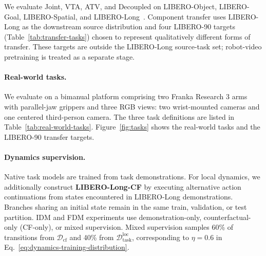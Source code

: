We evaluate Joint, VTA, ATV, and Decoupled on LIBERO-Object, LIBERO-Goal,
LIBERO-Spatial, and LIBERO-Long~\cite{liu2023libero}.
Component transfer uses LIBERO-Long as the downstream source
distribution and four LIBERO-90 targets (Table~\ref{tab:transfer-tasks}) chosen to represent qualitatively different forms of transfer. These targets are outside the LIBERO-Long
source-task set; robot-video pretraining is treated as a separate stage.

\begin{table}[t]
    \centering
    \caption{Real-world bimanual manipulation tasks.}
    \label{tab:real-world-tasks}
    \small
\end{table}

\paragraph{Real-world tasks.}
We evaluate on a bimanual platform comprising two Franka Research 3 arms
with parallel-jaw grippers and three RGB views: two wrist-mounted cameras
and one centered third-person camera. The three task definitions
are listed in Table~\ref{tab:real-world-tasks}. Figure~\ref{fig:tasks} shows the
real-world tasks and the LIBERO-90 transfer targets.

\paragraph{Dynamics supervision.}
Native task models are trained from task demonstrations. For local dynamics,
we additionally construct \textbf{LIBERO-Long-CF} by executing alternative
action continuations from states encountered in LIBERO-Long demonstrations.
Branches sharing an initial state remain in the same train, validation, or
test partition.
IDM and FDM experiments use demonstration-only, counterfactual-only
(CF-only), or mixed supervision. Mixed supervision samples 60\% of
transitions from $\mathcal D_{\mathrm{cf}}$ and 40\% from
$\mathcal D_{\mathrm{task}}^{\mathrm{loc}}$, corresponding to $\eta=0.6$
in Eq.~\ref{eq:dynamics-training-distribution}.


